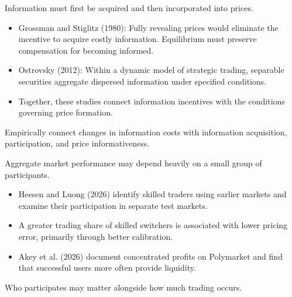\begin{frame}[t]
\par{}
\begin{pmbody}
{\color{pmGrey}\fontsize{20}{27}\selectfont Information must first be acquired and then incorporated into prices.\par}
\begin{itemize}\pmspreaditems
  \item Grossman and Stiglitz (1980): Fully revealing prices would eliminate the incentive to acquire costly information. Equilibrium must preserve compensation for becoming informed.
  \item Ostrovsky (2012): Within a dynamic model of strategic trading, separable securities aggregate dispersed information under specified conditions.
  \item Together, these studies connect information incentives with the conditions governing price formation.
\end{itemize}
\begin{pmcallout}
  Empirically connect changes in information costs with information acquisition, participation, and price informativeness.
\end{pmcallout}
\end{pmbody}
\end{frame}

\begin{frame}[t]
\par{}
\begin{pmbody}
{\color{pmGrey}\fontsize{20}{27}\selectfont Aggregate market performance may depend heavily on a small group of participants.\par}
\begin{itemize}\pmspreaditems
  \item Heesen and Luong (2026) identify skilled traders using earlier markets and examine their participation in separate test markets.
  \item A greater trading share of skilled switchers is associated with lower pricing error, primarily through better calibration.
  \item Akey et al. (2026) document concentrated profits on Polymarket and find that successful users more often provide liquidity.
\end{itemize}
\begin{pmcallout}[Interpretation]
  Who participates may matter alongside how much trading occurs.
\end{pmcallout}
\end{pmbody}
\end{frame}


